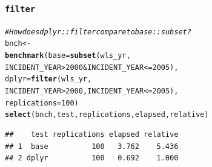\documentclass{beamer}\usepackage[]{graphicx}\usepackage[]{color}
\makeatletter
\newcommand{\hlnum}[1]{\textcolor[rgb]{0.686,0.059,0.569}{#1}}%
\newcommand{\hlcom}[1]{\textcolor[rgb]{0.678,0.584,0.686}{\textit{#1}}}%
\newcommand{\hlopt}[1]{\textcolor[rgb]{0,0,0}{#1}}%
\newcommand{\hlstd}[1]{\textcolor[rgb]{0.345,0.345,0.345}{#1}}%
\newcommand{\hlkwb}[1]{\textcolor[rgb]{0.69,0.353,0.396}{#1}}%
\newcommand{\hlkwc}[1]{\textcolor[rgb]{0.333,0.667,0.333}{#1}}%
\newcommand{\hlkwd}[1]{\textcolor[rgb]{0.737,0.353,0.396}{\textbf{#1}}}%
\newenvironment{kframe}{%
 \def\at@end@of@kframe{}%
 \ifinner\ifhmode%
  \def\at@end@of@kframe{\end{minipage}}%
  \begin{minipage}{\columnwidth}%
 \fi\fi%
 \def\FrameCommand##1{\hskip\@totalleftmargin \hskip-\fboxsep
 \colorbox{shadecolor}{##1}\hskip-\fboxsep
     \hskip-\linewidth \hskip-\@totalleftmargin \hskip\columnwidth}%
 \MakeFramed {\advance\hsize-\width
   \@totalleftmargin\z@ \linewidth\hsize
   \@setminipage}}%
 {\par\unskip\endMakeFramed%
 \at@end@of@kframe}
\newenvironment{knitrout}{}{} %
\makeatother
\begin{document}
\begin{frame}[fragile]
  \frametitle{{\tt filter}}

\begin{knitrout}\footnotesize
{}\color{fgcolor}\begin{kframe}
\begin{alltt}
\hlcom{# How does dplyr::filter compare to base::subset?}
\hlstd{bnch} \hlkwb{<-}
  \hlkwd{benchmark}\hlstd{(}\hlkwc{base} \hlstd{=} \hlkwd{subset}\hlstd{(wls_yr,}
                          \hlstd{INCIDENT_YEAR} \hlopt{>} \hlnum{2000} \hlopt{&} \hlstd{INCIDENT_YEAR} \hlopt{<=} \hlnum{2005}\hlstd{),}
            \hlkwc{dplyr} \hlstd{=} \hlkwd{filter}\hlstd{(wls_yr,}
                           \hlstd{INCIDENT_YEAR} \hlopt{>} \hlnum{2000}\hlstd{, INCIDENT_YEAR} \hlopt{<=} \hlnum{2005}\hlstd{),}
            \hlkwc{replications} \hlstd{=} \hlnum{100}\hlstd{)}
\hlkwd{select}\hlstd{(bnch, test, replications, elapsed, relative)}
\end{alltt}
\begin{verbatim}
##    test replications elapsed relative
## 1  base          100   3.762    5.436
## 2 dplyr          100   0.692    1.000
\end{verbatim}
\end{kframe}
\end{knitrout}
\end{frame} 
\end{document}
